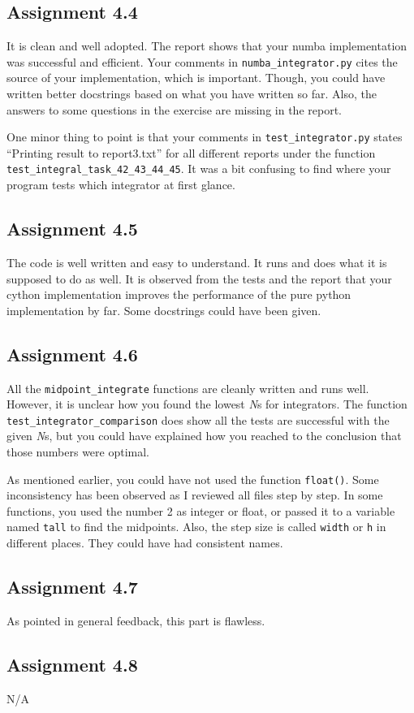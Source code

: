 \documentclass[a4paper]{article}
\begin{document}
\subsection*{Assignment 4.4}

It is clean and well adopted. The report shows that your numba implementation was successful and efficient. Your comments in \texttt{numba\_integrator.py} cites the source of your implementation, which is important. Though, you could have written better docstrings based on what you have written so far. Also, the answers to some questions in the exercise are missing in the report.\par
One minor thing to point is that your comments in \texttt{test\_integrator.py} states ``Printing result to report3.txt'' for all different reports under the function \texttt{test\_integral\_task\_42\_43\_44\_45}. It was a bit confusing to find where your program tests which integrator at first glance.

\subsection*{Assignment 4.5}

The code is well written and easy to understand. It runs and does what it is supposed to do as well. It is observed from the tests and the report that your cython implementation improves the performance of the pure python implementation by far. Some docstrings could have been given.

\subsection*{Assignment 4.6}

All the \texttt{midpoint\_integrate} functions are cleanly written and runs well. However, it is unclear how you found the lowest \textit{N}s for integrators. The function \texttt{test\_integrator\_comparison} does show all the tests are successful with the given \textit{N}s, but you could have explained how you reached to the conclusion that those numbers were optimal. \par

As mentioned earlier, you could have not used the function \texttt{float()}. Some inconsistency has been observed as I reviewed all files step by step. In some functions, you used the number 2 as integer or float, or passed it to a variable named \texttt{tall} to find the midpoints. Also, the step size is called \texttt{width} or \texttt{h} in different places. They could have had consistent names.

\subsection*{Assignment 4.7}
As pointed in general feedback, this part is flawless.

\subsection*{Assignment 4.8}
N/A
\end{document}
